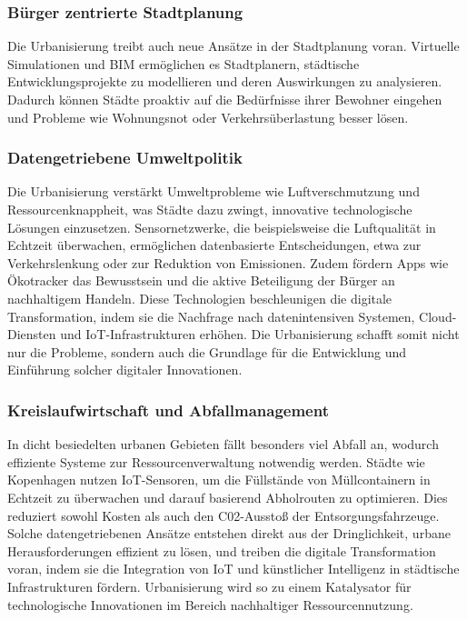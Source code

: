 \documentclass[conference,compsoc,final,a4paper, onecolumn, 11pt]{IEEEtran}
\begin{document}
\subsubsection{Bürger zentrierte Stadtplanung}
Die Urbanisierung treibt auch neue Ansätze in der Stadtplanung voran. 
Virtuelle Simulationen und \ac{BIM} ermöglichen es Stadtplanern, städtische Entwicklungsprojekte zu modellieren und deren Auswirkungen zu analysieren. 
Dadurch können Städte proaktiv auf die Bedürfnisse ihrer Bewohner eingehen und Probleme wie Wohnungsnot oder Verkehrsüberlastung besser lösen. \autocite{mckinsey_global_institute_smart_2021}


\subsubsection{Datengetriebene Umweltpolitik}
Die Urbanisierung verstärkt Umweltprobleme wie Luftverschmutzung und Ressourcenknappheit, was Städte dazu zwingt, innovative technologische Lösungen einzusetzen. 
Sensornetzwerke, die beispielsweise die Luftqualität in Echtzeit überwachen, ermöglichen datenbasierte Entscheidungen, etwa zur Verkehrslenkung oder zur Reduktion von Emissionen. 
Zudem fördern Apps wie Ökotracker das Bewusstsein und die aktive Beteiligung der Bürger an nachhaltigem Handeln. 
Diese Technologien beschleunigen die digitale Transformation, indem sie die Nachfrage nach datenintensiven Systemen, Cloud-Diensten und \ac{IoT}-Infrastrukturen erhöhen. 
Die Urbanisierung schafft somit nicht nur die Probleme, sondern auch die Grundlage für die Entwicklung und Einführung solcher digitaler Innovationen. \autocite{sensors_smart_2015}

 
\subsubsection{Kreislaufwirtschaft und Abfallmanagement}
In dicht besiedelten urbanen Gebieten fällt besonders viel Abfall an, wodurch effiziente Systeme zur Ressourcenverwaltung notwendig werden. 
Städte wie Kopenhagen nutzen \ac{IoT}-Sensoren, um die Füllstände von Müllcontainern in Echtzeit zu überwachen und darauf basierend Abholrouten zu optimieren. 
Dies reduziert sowohl Kosten als auch den C02-Ausstoß der Entsorgungsfahrzeuge. 
Solche datengetriebenen Ansätze entstehen direkt aus der Dringlichkeit, urbane Herausforderungen effizient zu lösen, und treiben die digitale Transformation voran, indem sie die Integration von IoT und künstlicher Intelligenz in städtische Infrastrukturen fördern. 
Urbanisierung wird so zu einem Katalysator für technologische Innovationen im Bereich nachhaltiger Ressourcennutzung. \autocite{sensors_smart_2015}
\end{document}
